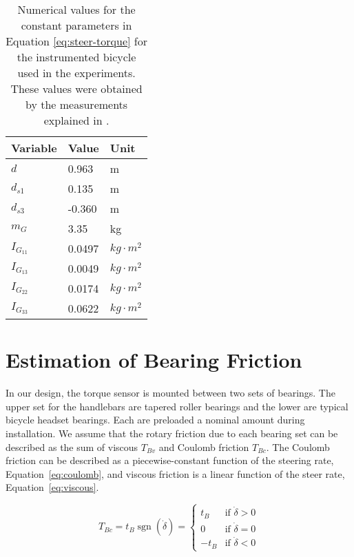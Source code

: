 \documentclass[10pt]{article}
\begin{document}
\begin{table}
  \centering
  \caption{Numerical values for the constant parameters in Equation
    \ref{eq:steer-torque} for the instrumented bicycle used in the experiments.
    These values were obtained by the measurements explained in
    \cite{Moore2012}.}
  \begin{tabular}{lll}
    \toprule
    Variable     & Value  & Unit \\
    \midrule
    $d$          & 0.963  & m\\
    $d_{s1}$     & 0.135  & m \\
    $d_{s3}$     & -0.360 & m \\
    $m_G$        & 3.35   & kg \\
    $I_{G_{11}}$ & 0.0497 & $kg \cdot m^2$ \\
    $I_{G_{13}}$ & 0.0049 & $kg \cdot m^2$ \\
    $I_{G_{22}}$ & 0.0174 & $kg \cdot m^2$ \\
    $I_{G_{33}}$ & 0.0622 & $kg \cdot m^2$ \\
    \bottomrule
  \end{tabular}
  \label{tab:numerical-constants}
\end{table}

\section*{Estimation of Bearing Friction}
\label{sec:bearing-friction}

In our design, the torque sensor is mounted between two sets of bearings. The
upper set for the handlebars are tapered roller bearings and the lower are
typical bicycle headset bearings. Each are preloaded a nominal amount during
installation. We assume that the rotary friction due to each bearing set can be
described as the sum of viscous $T_{Bv}$ and Coulomb friction $T_{Bc}$. The
Coulomb friction can be described as a piecewise-constant function of the
steering rate, Equation~\ref{eq:coulomb}, and viscous friction is a linear
function of the steer rate, Equation~\ref{eq:viscous}.

\begin{equation}
  T_{Bc} = t_B \operatorname{sgn}(\dot\delta) =
  \begin{cases}
    t_B  & \textrm{if $\dot{\delta}>0$}\\
    0    & \textrm{if $\dot{\delta}=0$}\\
    -t_B & \textrm{if $\dot{\delta}<0$}
  \end{cases}
  \label{eq:coulomb}
\end{equation}
\end{document}
